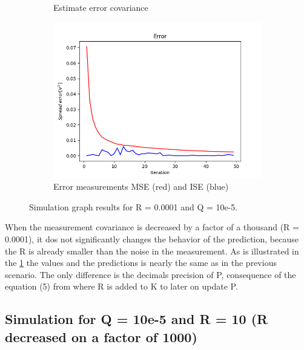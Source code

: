 \documentclass{article}
\begin{document}
\begin{figure}[H]
\begin{subfigure} {.5\textwidth}
            \caption{Estimate error covariance}
        \end{subfigure}
        \begin{subfigure}{.5\textwidth}            
            \centering
            \includegraphics[width=0.6\linewidth]{./img/r00001q_E.png}
            \caption{Error measurements MSE (red) and ISE (blue)}
        \end{subfigure}
        \caption{Simulation graph results for R = 0.0001 and Q = 10e-5.}
        \label{fig:simulation2}
    \end{figure}

    When the measurement covariance is decreased by a factor of a thousand (R = 0.0001), it dos not 
    significantly changes the behavior of the prediction, because the R is already smaller than the noise
    in the measurement. As is illustrated in the \ref{fig:simulation2} the values and the predictions is nearly
    the same as in the previous scenario. The only difference is the decimals precision of P,  consequence
    of the equation (5) from \cite{LabManual} where R is added to K to later on update P.


    \subsection{Simulation for Q = 10e-5 and R = 10 (R decreased on a factor of 1000)}
\end{document}
